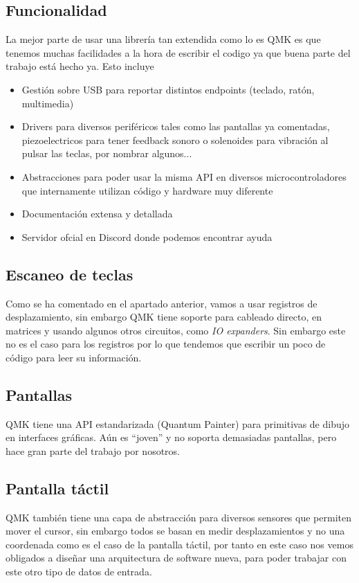 \subsection{Funcionalidad}
La mejor parte de usar una librería tan extendida como lo es QMK es que tenemos muchas facilidades a la hora de escribir el codigo ya que buena parte del trabajo está hecho ya. Esto incluye
\begin{itemize}
    \item Gestión sobre USB para reportar distintos endpoints (teclado, ratón, multimedia)
    \item Drivers para diversos periféricos tales como las pantallas ya comentadas, piezoelectricos para tener feedback sonoro o solenoides para vibración al pulsar las teclas, por nombrar algunos...
    \item Abstracciones para poder usar la misma API en diversos microcontroladores que internamente utilizan código y hardware muy diferente
    \item Documentación extensa y detallada
    \item Servidor ofcial en Discord donde podemos encontrar ayuda
\end{itemize}

\subsection{Escaneo de teclas}
Como se ha comentado en el apartado anterior, vamos a usar registros de desplazamiento, sin embargo QMK tiene soporte para cableado directo, en matrices y usando algunos otros circuitos, como \textit{IO expanders}. Sin embargo este no es el caso para los registros por lo que tendemos que escribir un poco de código para leer su información.

\subsection{Pantallas}
QMK tiene una API estandarizada (Quantum Painter\cite{qp}) para primitivas de dibujo en interfaces gráficas. Aún es ``joven'' y no soporta demasiadas pantallas, pero hace gran parte del trabajo por nosotros.

\subsection{Pantalla táctil}
QMK también tiene una capa de abstracción\cite{pointing} para diversos sensores que permiten mover el cursor, sin embargo todos se basan en medir desplazamientos y no una coordenada como es el caso de la pantalla táctil, por tanto en este caso nos vemos obligados a diseñar una arquitectura de software nueva, para poder trabajar con este otro tipo de datos de entrada.

